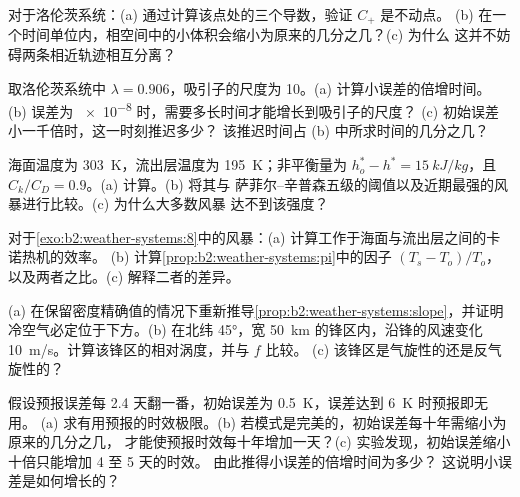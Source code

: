 \begin{exercise}[$\star\star$]\label{exo:b2:weather-systems:6}
对于洛伦茨系统：(a) 通过计算该点处的三个导数，验证 $C_+$ 是不动点。
(b) 在一个时间单位内，相空间中的小体积会缩小为原来的几分之几？(c) 为什么
这并不妨碍两条相近轨迹相互分离？
\end{exercise}

\begin{exercise}[$\star\star$]\label{exo:b2:weather-systems:7}
取洛伦茨系统中 $\lambda = 0.906$，吸引子的尺度为 10。(a) 计算小误差的倍增时间。
(b) 误差为 \num{e-8} 时，需要多长时间才能增长到吸引子的尺度？
(c) 初始误差小一千倍时，这一时刻推迟多少？
该推迟时间占 (b) 中所求时间的几分之几？
\end{exercise}

\begin{exercise}[$\star\star$]\label{exo:b2:weather-systems:8}
海面温度为 \qty{303}{K}，流出层温度为 \qty{195}{K}；非平衡量为 $h_o^* - h^* =
\qty{15}{kJ/kg}$，且 $C_k/C_D = 0.9$。(a) 计算。(b) 将其与
萨菲尔–辛普森五级的阈值以及近期最强的风暴进行比较。(c) 为什么大多数风暴
达不到该强度？
\end{exercise}

\begin{exercise}[$\star\star$]\label{exo:b2:weather-systems:9}
对于\cref{exo:b2:weather-systems:8}中的风暴：(a) 计算工作于海面与流出层之间的卡诺热机的效率。
(b) 计算\cref{prop:b2:weather-systems:pi}中的因子 $(T_s - T_o)/T_o$，
以及两者之比。(c) 解释二者的差异。
\end{exercise}

\begin{exercise}[$\star\star\star$]\label{exo:b2:weather-systems:10}
(a) 在保留密度精确值的情况下重新推导\cref{prop:b2:weather-systems:slope}，并证明
冷空气必定位于下方。(b) 在北纬 \ang{45}，宽 \qty{50}{km} 的锋区内，沿锋的风速变化
\qty{10}{m/s}。计算该锋区的相对涡度，并与 $f$ 比较。
(c) 该锋区是气旋性的还是反气旋性的？
\end{exercise}

\begin{exercise}[$\star\star\star$]\label{exo:b2:weather-systems:11}
假设预报误差每 2.4 天翻一番，初始误差为 \qty{0.5}{K}，误差达到 \qty{6}{K} 时预报即无用。
(a) 求有用预报的时效极限。(b) 若模式是完美的，初始误差每十年需缩小为原来的几分之几，
才能使预报时效每十年增加一天？(c) 实验发现，初始误差缩小十倍只能增加 4 至 5 天的时效。
由此推得小误差的倍增时间为多少？
这说明小误差是如何增长的？
\end{exercise}

